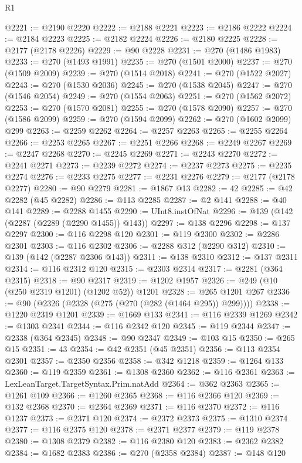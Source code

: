 \begin{lexlean}{R1}
\begin{coremodule}
@2221 := @2190 @2220
@2222 := @2188 @2221
@2223 := @2186 @2222
@2224 := @2184 @2223
@2225 := @2182 @2224
@2226 := @2180 @2225
@2228 := @2177 (@2178 @2226)
@2229 := @90 @2228
@2231 := @270 (@1486 @1983)
@2233 := @270 (@1493 @1991)
@2235 := @270 (@1501 @2000)
@2237 := @270 (@1509 @2009)
@2239 := @270 (@1514 @2018)
@2241 := @270 (@1522 @2027)
@2243 := @270 (@1530 @2036)
@2245 := @270 (@1538 @2045)
@2247 := @270 (@1546 @2054)
@2249 := @270 (@1554 @2063)
@2251 := @270 (@1562 @2072)
@2253 := @270 (@1570 @2081)
@2255 := @270 (@1578 @2090)
@2257 := @270 (@1586 @2099)
@2259 := @270 (@1594 @2099)
@2262 := @270 (@1602 @2099) @299
@2263 := @2259 @2262
@2264 := @2257 @2263
@2265 := @2255 @2264
@2266 := @2253 @2265
@2267 := @2251 @2266
@2268 := @2249 @2267
@2269 := @2247 @2268
@2270 := @2245 @2269
@2271 := @2243 @2270
@2272 := @2241 @2271
@2273 := @2239 @2272
@2274 := @2237 @2273
@2275 := @2235 @2274
@2276 := @2233 @2275
@2277 := @2231 @2276
@2279 := @2177 (@2178 @2277)
@2280 := @90 @2279
@2281 := @1867 @13
@2282 := 42
@2285 := @42 @2282 (@45 @2282)
@2286 := @113 @2285
@2287 := @2 @141
@2288 := @40 @141
@2289 := @2288 @1455
@2290 := UInt8.instOfNat
@2296 := @139 (@142 (@2287 (@2289 (@2290 @1455)) @143))
@2297 := @138 @2296
@2298 := @137 @2297
@2300 := @116 @2298 @120
@2301 := @119 @2300
@2302 := @2286 @2301
@2303 := @116 @2302
@2306 := @2288 @312 (@2290 @312)
@2310 := @139 (@142 (@2287 @2306 @143))
@2311 := @138 @2310
@2312 := @137 @2311
@2314 := @116 @2312 @120
@2315 := @2303 @2314
@2317 := @2281 (@364 @2315)
@2318 := @90 @2317
@2319 := @1202 @1957
@2326 := @249 (@10 (@250 @2319 @1201) (@1202 @52)) @1201
@2328 := @265 @1201 @267
@2336 := @90 (@2326 (@2328 (@275 (@270 (@282 (@1464 @295)) @299))))
@2338 := @1220 @2319 @1201
@2339 := @1669 @133
@2341 := @116 @2339 @1269
@2342 := @1303 @2341
@2344 := @116 @2342 @120
@2345 := @119 @2344
@2347 := @2338 (@364 @2345)
@2348 := @90 @2347
@2349 := @103 @15
@2350 := @265 @15
@2351 := 43
@2354 := @42 @2351 (@45 @2351)
@2356 := @113 @2354 @2301
@2357 := @2350 @2356
@2358 := @342 @1218
@2359 := @1264 @133
@2360 := @119 @2359
@2361 := @1308 @2360
@2362 := @116 @2361
@2363 := LexLeanTarget.TargetSyntax.Prim.natAdd
@2364 := @362 @2363
@2365 := @1261 @109
@2366 := @1260 @2365
@2368 := @116 @2366 @120
@2369 := @132 @2368
@2370 := @2364 @2369
@2371 := @116 @2370
@2372 := @116 @1237
@2373 := @2371 @120
@2374 := @2372 @2373
@2375 := @1310 @2374
@2377 := @116 @2375 @120
@2378 := @2371 @2377
@2379 := @119 @2378
@2380 := @1308 @2379
@2382 := @116 @2380 @120
@2383 := @2362 @2382
@2384 := @1682 @2383
@2386 := @270 (@2358 @2384)
@2387 := @148 @120

\end{coremodule}
\end{lexlean}
